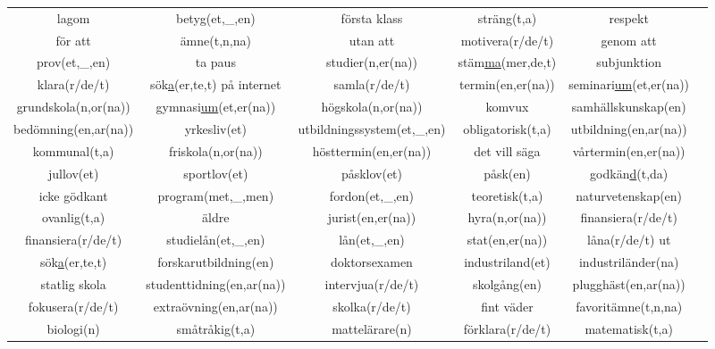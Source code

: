 
\begin{center}
    \begin{adjustwidth}{-2.55cm}{}
        \begin{tabular}{|c c c c c c|}
            \hline
            lagom & betyg(et,\_,en) & första klass & sträng(t,a) & respekt &  \\
            för att & ämne(t,n,na) & utan att & motivera(r/de/t) & genom att &  \\
            prov(et,\_,en) & ta paus & studier(n,er(na)) & stäm\underline{ma}(mer,de,t) & subjunktion &  \\
            klara(r/de/t) & sök\underline{a}(er,te,t) på internet & samla(r/de/t) & termin(en,er(na)) & seminari\underline{um}(et,er(na)) &  \\
            grundskola(n,or(na)) & gymnasi\underline{um}(et,er(na)) & högskola(n,or(na)) & komvux & samhällskunskap(en) &  \\
            bedömning(en,ar(na)) & yrkesliv(et) & utbildningssystem(et,\_,en) & obligatorisk(t,a) & utbildning(en,ar(na)) &  \\
            kommunal(t,a) & friskola(n,or(na)) & hösttermin(en,er(na)) & det vill säga & vårtermin(en,er(na)) &  \\
            jullov(et) & sportlov(et) & påsklov(et) & påsk(en) & godkän\underline{d}(t,da) &  \\
            icke gödkant & program(met,\_,men) & fordon(et,\_,en) & teoretisk(t,a) & naturvetenskap(en) &  \\
            ovanlig(t,a) & äldre & jurist(en,er(na)) & hyra(n,or(na)) & finansiera(r/de/t) &  \\
            finansiera(r/de/t) & studielån(et,\_,en) & lån(et,\_,en) & stat(en,er(na)) & låna(r/de/t) ut &  \\
            sök\underline{a}(er,te,t) & forskarutbildning(en) & doktorsexamen & industriland(et) & industriländer(na) &  \\
            statlig skola & studenttidning(en,ar(na)) & intervjua(r/de/t) & skolgång(en) & plugghäst(en,ar(na)) &  \\
            fokusera(r/de/t) & extraövning(en,ar(na)) & skolka(r/de/t) & fint väder & favoritämne(t,n,na) &  \\
            biologi(n) & småtråkig(t,a) & mattelärare(n) & förklara(r/de/t) & matematisk(t,a) &  \\

\end{tabular}
\end{adjustwidth}
\end{center}
